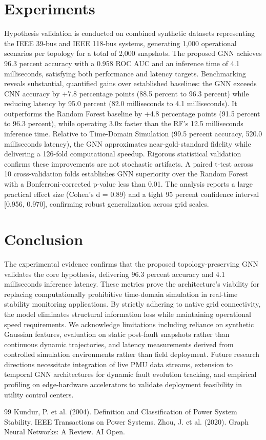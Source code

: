 \documentclass[11pt,a4paper]{article}
\begin{document}
\section{Experiments}
Hypothesis validation is conducted on combined synthetic datasets representing the IEEE 39-bus and IEEE 118-bus systems, generating 1,000 operational scenarios per topology for a total of 2,000 snapshots. The proposed GNN achieves 96.3 percent accuracy with a 0.958 ROC AUC and an inference time of 4.1 milliseconds, satisfying both performance and latency targets. Benchmarking reveals substantial, quantified gains over established baselines: the GNN exceeds CNN accuracy by +7.8 percentage points (88.5 percent to 96.3 percent) while reducing latency by 95.0 percent (82.0 milliseconds to 4.1 milliseconds). It outperforms the Random Forest baseline by +4.8 percentage points (91.5 percent to 96.3 percent), while operating 3.0x faster than the RF's 12.5 milliseconds inference time. Relative to Time-Domain Simulation (99.5 percent accuracy, 520.0 milliseconds latency), the GNN approximates near-gold-standard fidelity while delivering a 126-fold computational speedup. Rigorous statistical validation confirms these improvements are not stochastic artifacts. A paired t-test across 10 cross-validation folds establishes GNN superiority over the Random Forest with a Bonferroni-corrected p-value less than 0.01. The analysis reports a large practical effect size (Cohen’s d = 0.89) and a tight 95 percent confidence interval [0.956, 0.970], confirming robust generalization across grid scales.

\section{Conclusion}
The experimental evidence confirms that the proposed topology-preserving GNN validates the core hypothesis, delivering 96.3 percent accuracy and 4.1 milliseconds inference latency. These metrics prove the architecture's viability for replacing computationally prohibitive time-domain simulation in real-time stability monitoring applications. By strictly adhering to native grid connectivity, the model eliminates structural information loss while maintaining operational speed requirements. We acknowledge limitations including reliance on synthetic Gaussian features, evaluation on static post-fault snapshots rather than continuous dynamic trajectories, and latency measurements derived from controlled simulation environments rather than field deployment. Future research directions necessitate integration of live PMU data streams, extension to temporal GNN architectures for dynamic fault evolution tracking, and empirical profiling on edge-hardware accelerators to validate deployment feasibility in utility control centers.


\begin{thebibliography}{99}
 Kundur, P. et al. (2004). Definition and Classification of Power System Stability. IEEE Transactions on Power Systems.
 Zhou, J. et al. (2020). Graph Neural Networks: A Review. AI Open.
\end{thebibliography}
\end{document}

